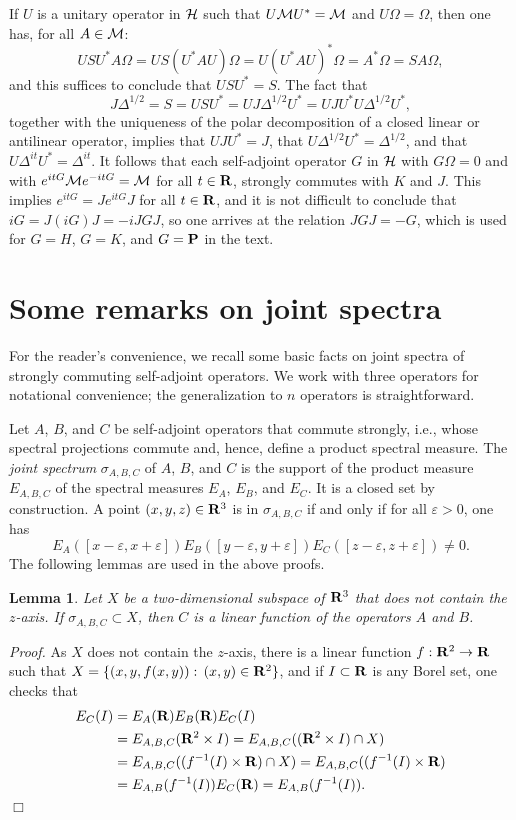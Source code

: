 \documentclass[a4paper,11pt]{article}
\newtheorem{lemma}[theorem]{Lemma}{\bf}{\it}
\def\dt{\cal}
\def\dM{{\dt M}}
\def\H{{\cal H}}
\def\gO{\Omega}
\def\eps{\varepsilon}
\def\Halmos{\quad\hfill$\Box$}
\def\reals{{\bf R}}
\begin{document}
\begin{appendix}
If $U$ is a unitary operator in $\H$ such that $U\dM U^*=\dM$ and
$U\gO=\gO$, then one has, for all $A\in\dM$:
$$USU^*A\gO=US(U^*AU)\gO=U(U^*AU)^*\gO=A^*\gO=SA\gO,$$
and this suffices to conclude that
$USU^*=S$. The fact that
$$J\Delta^{1/2}=S=USU^*=UJ\Delta^{1/2}U^*=UJU^*U\Delta^{1/2}U^*,$$
together with the uniqueness of the polar decomposition of a closed linear
or antilinear operator, implies that $UJU^*=J$, that
$U\Delta^{1/2}U^*=\Delta^{1/2}$, and that $U\Delta^{it}U^*=\Delta^{it}$.
It follows that each self-adjoint operator $G$ in $\H$ with $G\gO=0$
and with $e^{itG}\dM e^{-itG}=\dM$ for all $t\in\reals$,
strongly commutes with $K$ and $J$. This implies $e^{itG}=Je^{itG}J$
for all $t\in\reals$, and it is not difficult to conclude
that $iG=J(iG)J=-iJGJ$, so one arrives at the relation $JGJ=-G$, which is
used for $G=H$, $G=K$, and $G={\bf P}$ in the text.

\section{Some remarks on joint spectra}\label{jspec}

For the reader's convenience, we recall some basic facts on joint spectra
of strongly commuting self-adjoint operators. We work with three operators
for notational convenience; the generalization to $n$ operators is
straightforward.

Let $A$, $B$, and $C$ be self-adjoint operators that commute strongly,
i.e., whose spectral projections commute and, hence, define a
product spectral measure. The {\it joint spectrum} $\sigma_{A,B,C}$
of $A$, $B$, and $C$ is the support of the product measure $E_{A,B,C}$
of the spectral measures $E_A$, $E_B$, and $E_C$. It is a closed set by
construction. A point $(x,y,z)\in\reals^3$
is in $\sigma_{A,B,C}$ if and only if for all $\eps>0$, one has
$$E_A([x-\eps,x+\eps])E_B([y-\eps,y+\eps])E_C([z-\eps,z+\eps])\not=0.$$
The following lemmas are used in the above proofs.
\begin{lemma}\label{linear}
Let $X$ be a two-dimensional subspace of $\reals^3$ that does not
contain the $z$-axis. If $\sigma_{A,B,C}\subset X$, then $C$ is a
linear function of the operators $A$ and $B$.
\end{lemma}
{\it Proof.}
As $X$ does not contain the $z$-axis, there is a
linear function $f:\reals^2\to\reals$ such that
$X=\{(x,y,f(x,y)):\,(x,y)\in\reals^2\}$, and if
$I\subset\reals$ is any Borel set, one checks that
\begin{align*}
E_C(I)&=E_A(\reals)E_B(\reals)E_C(I)\\
&=E_{A,B,C}(\reals^2\times I)=E_{A,B,C}((\reals^2\times I)\cap X)\\
&=E_{A,B,C}((f^{-1}(I)\times\reals)\cap X)=E_{A,B,C}((f^{-1}(I)\times\reals)\\
&=E_{A,B}(f^{-1}(I))E_C(\reals)=E_{A,B}(f^{-1}(I)).
\end{align*}
\Halmos


\end{appendix}
\end{document}
